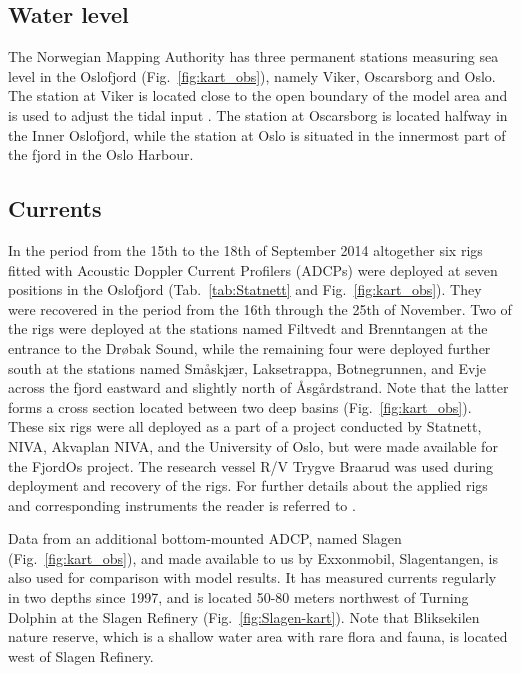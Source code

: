 \newpage

\subsection{Water level}
\label{subsec:wlevelo}
The Norwegian Mapping Authority has three permanent stations measuring sea level in the Oslofjord (Fig.~\ref{fig:kart_obs}), namely Viker, Oscarsborg and Oslo. The station at Viker is located close to the open boundary of the model area and is used to adjust the tidal input \cite{hjelm:etal:2017}. The station at Oscarsborg is located halfway in the Inner Oslofjord, while the station at Oslo is situated in the innermost part of the fjord in the Oslo Harbour.

\subsection{Currents}
\label{subsec:curreo}

In the period from the 15th to the 18th of September 2014 altogether six rigs fitted with Acoustic Doppler Current Profilers (ADCPs) were deployed at seven positions in the Oslofjord (Tab.~\ref{tab:Statnett} and Fig.~\ref{fig:kart_obs}). They were recovered in the period from the 16th through the 25th of November. Two of the rigs were deployed at the stations named Filtvedt and Brenntangen at the entrance to the Dr{\o}bak Sound, while the remaining four were deployed further south at the stations named Sm{\aa}skj{\ae}r, Laksetrappa, Botnegrunnen, and Evje across the fjord eastward and slightly north of {\AA}sg{\aa}rdstrand. Note that the latter forms a cross section located between two deep basins (Fig.~\ref{fig:kart_obs}).  These six rigs were all deployed as a part of a project conducted by Statnett, NIVA, Akvaplan NIVA, and the University of Oslo, but were made available for the FjordOs project. The research vessel R/V Trygve Braarud was used during deployment and recovery of the rigs. For further details about the applied rigs and corresponding instruments the reader is referred to \cite{staalstrom:2015}.

Data from an additional bottom-mounted ADCP, named Slagen (Fig.~\ref{fig:kart_obs}), and made available to us by Exxonmobil, Slagentangen, is also used for comparison with model results. It has measured currents regularly in two depths since 1997, and is located 50-80 meters northwest of Turning Dolphin at the Slagen Refinery (Fig.~\ref{fig:Slagen-kart}). Note that Bliksekilen nature reserve, which is a shallow water area with rare flora and fauna, is located west of Slagen Refinery. 

